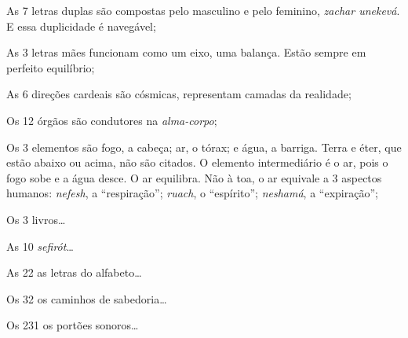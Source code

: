 \begin{center}
{\huge{}}
\end{center}

\noindent{}As 7 letras duplas são compostas pelo masculino e pelo feminino, \textit{zachar unekevá}. E essa duplicidade é navegável;

\smallskip
\noindent{}As 3 letras mães funcionam como um eixo, uma balança. Estão sempre em perfeito equilíbrio;

\smallskip
\noindent{}As 6 direções cardeais são cósmicas, representam camadas da realidade;

\smallskip
\noindent{}Os 12 órgãos são condutores na \textit{alma-corpo};

\smallskip
\noindent{}Os 3 elementos são fogo, a cabeça; ar, o tórax; e água, a barriga. Terra e éter, que estão abaixo ou acima, não são citados. O elemento intermediário é o ar, pois o fogo sobe e a água desce. O ar equilibra. Não à toa, o ar equivale a 3 aspectos humanos: \textit{nefesh}, a ``respiração''; \textit{ruach}, o ``espírito''; \textit{neshamá}, a ``expiração'';

\smallskip
\noindent{}Os 3 livros\ldots{}

\smallskip
\noindent{}As 10 \textit{sefirót}\ldots{}

\smallskip
\noindent{}As 22 as letras do alfabeto\ldots{}

\smallskip
\noindent{}Os 32 os caminhos de sabedoria\ldots{}

\smallskip
\noindent{}Os 231 os portões sonoros\ldots{}



